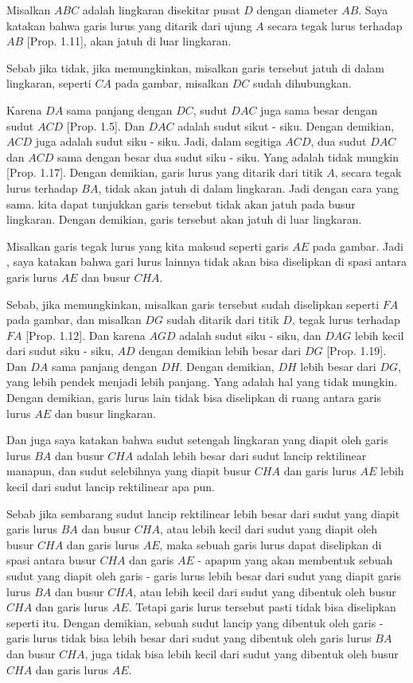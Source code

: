 \documentclass[a4paper]{book}
\begin{document}
Misalkan $ABC$ adalah lingkaran disekitar pusat $D$ dengan diameter $AB$. Saya 
katakan bahwa garis lurus yang ditarik dari ujung $A$ secara tegak lurus 
terhadap $AB$ [Prop. 1.11], akan jatuh di luar lingkaran.

Sebab jika tidak, jika memungkinkan, misalkan garis tersebut jatuh di dalam 
lingkaran, seperti $CA$ pada gambar, misalkan $DC$ sudah dihubungkan.

Karena $DA$ sama panjang dengan $DC$, sudut $DAC$ juga sama besar dengan sudut
$ACD$ [Prop. 1.5]. Dan $DAC$ adalah sudut sikut - siku. Dengan demikian, $ACD$
juga adalah sudut siku - siku. Jadi, dalam segitiga $ACD$, dua sudut $DAC$ dan
$ACD$ sama dengan besar dua sudut siku - siku. Yang adalah tidak mungkin [Prop.
1.17]. Dengan demikian, garis lurus yang ditarik dari titik $A$, secara tegak
lurus terhadap $BA$, tidak akan jatuh di dalam lingkaran. Jadi dengan cara yang
sama. kita dapat tunjukkan garis tersebut tidak akan jatuh pada busur lingkaran.
Dengan demikian, garis tersebut akan jatuh di luar lingkaran.

Misalkan garis tegak lurus yang kita maksud seperti garis $AE$ pada gambar. Jadi
, saya katakan bahwa gari lurus lainnya tidak akan bisa diselipkan di spasi
antara garis lurus $AE$ dan busur $CHA$.

Sebab, jika memungkinkan, misalkan garis tersebut sudah diselipkan seperti $FA$
pada gambar, dan misalkan $DG$ sudah ditarik dari titik $D$, tegak lurus 
terhadap $FA$ [Prop. 1.12]. Dan karena $AGD$ adalah sudut siku - siku, dan $DAG$
lebih kecil dari sudut siku - siku, $AD$ dengan demikian lebih besar dari $DG$
[Prop. 1.19]. Dan $DA$ sama panjang dengan $DH$. Dengan demikian, $DH$ lebih 
besar dari $DG$, yang lebih pendek menjadi lebih panjang. Yang adalah 
hal yang tidak mungkin. Dengan demikian, garis lurus lain tidak bisa diselipkan
di ruang antara garis lurus $AE$ dan busur lingkaran.

Dan juga saya katakan bahwa sudut setengah lingkaran yang diapit oleh garis 
lurus $BA$ dan busur $CHA$ adalah lebih besar dari sudut lancip rektilinear
manapun, dan sudut selebihnya yang diapit busur $CHA$ dan garis lurus $AE$ lebih
kecil dari sudut lancip rektilinear apa pun.

Sebab jika sembarang sudut lancip rektilinear lebih besar dari sudut yang diapit 
garis lurus $BA$ dan busur $CHA$, atau lebih kecil dari sudut yang diapit 
oleh busur $CHA$ dan garis lurus $AE$, maka sebuah garis lurus dapat diselipkan 
di spasi antara busur $CHA$ dan garis $AE$ - apapun yang akan membentuk sebuah 
sudut yang diapit oleh garis - garis lurus lebih besar dari sudut yang diapit 
garis lurus $BA$ dan busur $CHA$, atau lebih kecil dari sudut yang dibentuk
oleh busur $CHA$ dan garis lurus $AE$. Tetapi garis lurus tersebut pasti tidak 
bisa diselipkan seperti itu. Dengan demikian, sebuah sudut lancip yang dibentuk
oleh garis - garis lurus tidak bisa lebih besar dari sudut yang dibentuk oleh 
garis lurus $BA$ dan busur $CHA$, juga tidak bisa lebih kecil dari sudut yang
dibentuk oleh busur $CHA$ dan garis lurus $AE$.  
\end{document}
